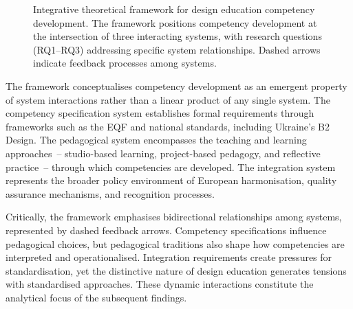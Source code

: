 \documentclass[ed]{acnsart}
\begin{document}
\begin{figure}[htbp]
{
		}
		\caption{Integrative theoretical framework for design education competency development. The framework positions competency development at the intersection of three interacting systems, with research questions (RQ1--RQ3) addressing specific system relationships. Dashed arrows indicate feedback processes among systems.}
		\label{fig:theoretical-framework}
	\end{figure}
	
	The framework conceptualises competency development as an emergent property of system interactions rather than a linear product of any single system. The competency specification system establishes formal requirements through frameworks such as the EQF and national standards, including Ukraine's B2 Design. The pedagogical system encompasses the teaching and learning approaches~-- studio-based learning, project-based pedagogy, and reflective practice~-- through which competencies are developed. The integration system represents the broader policy environment of European harmonisation, quality assurance mechanisms, and recognition processes.
	
	Critically, the framework emphasises bidirectional relationships among systems, represented by dashed feedback arrows. Competency specifications influence pedagogical choices, but pedagogical traditions also shape how competencies are interpreted and operationalised. Integration requirements create pressures for standardisation, yet the distinctive nature of design education generates tensions with standardised approaches. These dynamic interactions constitute the analytical focus of the subsequent findings.
	
\end{document}
